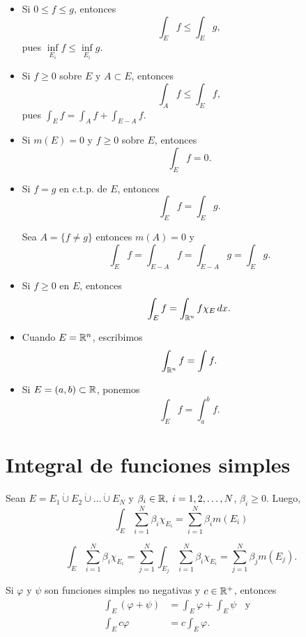 \begin{itemize}
    \item Si $0\leq f\leq g$, entonces 
    \[\int_E f \leq \int_E g,\] 
    pues $\inf\limits_{E_i} f \leq \inf\limits_{E_i} g.$
    \item Si $f\geq 0$ sobre $E$ y $A\subset E$, entonces \[\int_A f \leq \int_E f,\] pues 
    $\int_E f=\int_A f +\int_{E-A} f$.
    \item Si $m(E)=0$ y $f\geq 0$ sobre $E$, entonces
    \[\int_E f =0.\]
    \item Si $f=g$ en c.t.p. de $E$, entonces
    \[\int_E f =\int_E g.\]
    \begin{demo}
    Sea $A=\{f \neq g\}$ entonces $m(A)=0$ y 
    \[\int_E f =\int_{E-A} f =\int_{E-A} g=\int_E g.\]
    \end{demo}
    \item Si $f\geq 0$ en $E$, entonces
    \[\int_E  f = \int_{\mathbb{R}^n}  f \chi_E\,dx.\]
    \item 
    Cuando $E= \mathbb{R}^n$, escribimos 
    \[\int_{\mathbb{R}^n} f = \int f.\]
    \item Si $E=(a,b)\subset \mathbb{R}$, ponemos
     \[\int_{E} f = \int_a^b f.\]
    \end{itemize}
    
    \section{Integral de funciones simples}
    
    \begin{teorema}{}
    Sean $E=E_1 \dot{\cup} E_2\dot{\cup} \ldots \dot{\cup} E_N$ y 
    $\beta_i \in \mathbb{R},\; i=1,2,\ldots,N$, $\beta_i\geq 0$. Luego, 
    \[
    \int_E \sum\limits_{i=1}^N \beta_i \chi_{E_i}=
    \sum\limits_{i=1}^N \beta_i m(E_i)
    \]
    \end{teorema}
    
    \begin{demo}
    \[
    \int_E \sum\limits_{i=1}^N \beta_i \chi_{E_i}=
    \sum\limits_{j=1}^N \int_{E_j} \sum\limits_{i=1}^N \beta_i \chi_{E_i} =\sum\limits_{j=1}^N \beta_j m(E_j).
    \]
    \end{demo}
    
    \begin{teorema}{}
    Si $\varphi$  y $\psi$ son funciones simples no negativas y $c\in \mathbb{R}^+$, entonces
    \[\begin{split}
            \int_E (\varphi+\psi) &= \int_E \varphi +\int_E \psi \;\;\mbox{  y   }\;\;\\
        \int_E c\varphi &=c\int_E \varphi.
        \end{split}
    \]
    \end{teorema}
    
